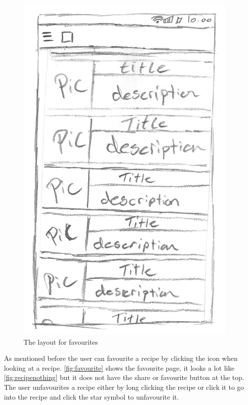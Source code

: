 \begin{figure}[H]
\begin{minipage}[b]{0.5\columnwidth}
\centering
\includegraphics[width=0.7\columnwidth]{img/prototypes/favorites.pdf}
\caption{The layout for favourites\label{fig:favourite}}
\end{minipage}
\end{figure}

As mentioned before the user can favourite a recipe by clicking the icon when looking at a recipe. \autoref{fig:favourite} shows the favourite page, it looks a lot like \autoref{fig:recipenothing} but it does not have the share or favourite button at the top. The user unfavourites a recipe either by long clicking the recipe or click it to go into the recipe and click the star symbol to unfavourite it.

